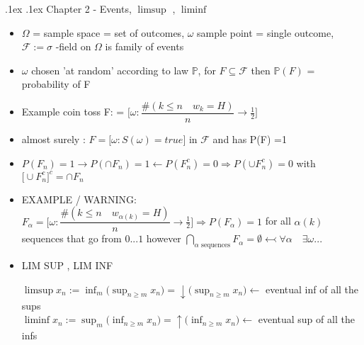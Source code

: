 \documentclass[10pt,landscape,a4paper]{article}
\makeatletter
\renewcommand{\section}{\@startsection{section}{1}{0mm}%
                                {.1ex}%
                                {.1ex}%
                                {\color{blue}\sffamily\small\bfseries}}
\newcommand{\mylp}{ \left ( }
\newcommand{\myrp}{ \right ) }
\makeatother
\begin{document}
\begin{multicols*}{3}
\begin{spacing}{0.5}
\begin{itemize}
\end{itemize}
	
\section{Chapter 2 - Events, $\limsup$ , $\liminf $}

\begin{itemize} 
\item $\Omega$ = sample space = set of outcomes, $\omega$ sample point = single outcome, $\mathcal{F} := \sigma$ -field on $\Omega$ is family of events

\item $\omega$ chosen 'at random' according to law $\mathbb{P}$, for $F \subseteq \mathcal{F} $ then $\mathbb{P} (F)$ = probability of F

\item Example coin toss F: = $ \bigg[ \omega : \dfrac{\# \mylp k \le n \quad  w_k=H \myrp}{n} \rightarrow \frac{1}{2} \bigg] $

\item almost surely : $F = \big[ \omega : S( \omega) = true \big] $ in $\mathcal{F}$ and has P(F) =1
\item $P(F_n)=1 \rightarrow P(\cap F_n) =1 \leftarrow P(F_n^c)=0 \Rightarrow P(\cup F_n^c) =0$ with $  {\big[\cup F_n^c\big]}^{c} = \cap F_n$

\item EXAMPLE / WARNING: $ F_{\alpha} = \bigg[ \omega : \dfrac{\# \mylp k \le n \quad  w_{\alpha(k)}=H \myrp}{n} \rightarrow \frac{1}{2} \bigg] \Rightarrow P(F_{\alpha})=1$ for all $ \alpha(k)$ sequences that go from $ 0 ... 1$ however $ \bigcap\limits_{\alpha \text{ sequences}} F_{\alpha} = \emptyset \leftarrowtail \forall \alpha \quad \exists \omega ...$

\item \colorbox{blue!10}{LIM SUP , LIM INF}

 $ \boxed { \limsup x_n := \inf_m \big( \sup_{n \ge m} x_n\big) = \downarrow \big( \sup_{n \ge m} x_n\big) } \leftarrow $  eventual inf of all the sups 
 \\
 $ \boxed { \liminf x_n := \sup_m \big( \inf_{n \ge m} x_n\big) = \uparrow \big( \inf_{n \ge m} x_n\big) } \leftarrow $  eventual sup  of all the infs



\pgfplotsset{compat=1.6}

 


\end{itemize}
\end{spacing}
\end{multicols*}
\end{document}
